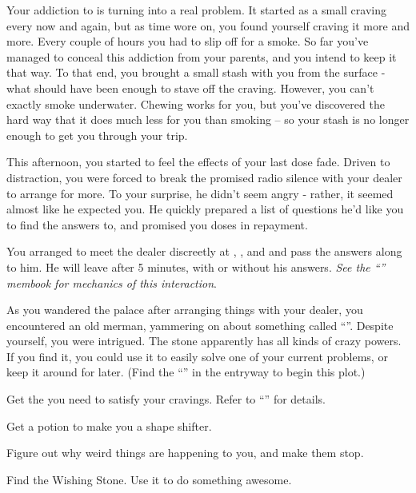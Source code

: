 \documentclass[char]{NeptuneBall}
\begin{document}
Your addiction to \iDrug{} is turning into a real problem. It started as a small craving every now and again, but as time wore on, you found yourself craving it more and more. Every couple of hours you had to slip off for a smoke. So far you've managed to conceal this addiction from your parents, and you intend to keep it that way. To that end, you brought a small stash with you from the surface - what should have been enough to stave off the craving. However, you can't exactly smoke underwater.  Chewing \iDrug{} works for you, but you've discovered the hard way that it does much less for you than smoking -- so your stash is no longer enough to get you through your trip.

This afternoon, you started to feel the effects of your last dose fade. Driven to distraction, you were forced to break the promised radio silence with your dealer to arrange for more. To your surprise, he didn't seem angry - rather, it seemed almost like he expected you. He quickly prepared a list of questions he'd like you to find the answers to, and promised you doses in repayment.

You arranged to meet the dealer discreetly at \cTFifteen{\MYname{}}, \cTOneFifteen{\MYname{}}, \cTTwoFifteen{\MYname{}} and \cTThreeFifteen{\MYname{}} and pass the answers along to him. He will leave after 5 minutes, with or without his answers. \emph{See the ``\mSpyBook{}'' membook for mechanics of this interaction}.

As you wandered the palace after arranging things with your dealer, you encountered an old merman, yammering on about something called ``\iWishingStone{\MYname}''. Despite yourself, you were intrigued. The stone apparently has all kinds of crazy powers. If you find it, you could use it to easily solve one of your current problems, or keep it around for later. (Find the ``\sOldMan{}'' in the entryway to begin this plot.)

\begin{itemz}[Goals]
  \item Get the \iDrug{} you need to satisfy your cravings. Refer to ``\gAddicted{}'' for details.
  \item Get a potion to make you a shape shifter.
	\item Figure out why weird things are happening to you, and make them stop.
	\item Find the Wishing Stone. Use it to do something awesome.
\end{itemz}
\end{document}
